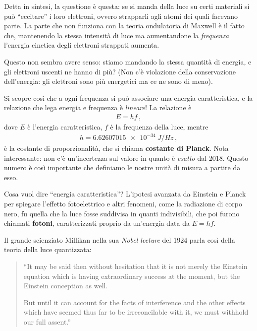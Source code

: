 \documentclass[a4paper,12pt]{article}
\begin{document}
Detta in sintesi, la questione è questa: se si manda della luce su certi materiali si può ``eccitare'' i loro elettroni, ovvero strapparli agli atomi dei quali facevano parte.
La parte che non funziona con la teoria ondulatoria di Maxwell è il fatto che, mantenendo la stessa intensità di luce ma aumentandone la \emph{frequenza} l'energia cinetica degli elettroni strappati aumenta. 

Questo non sembra avere senso: stiamo mandando la stessa quantità di energia, e gli elettroni uscenti ne hanno di più? 
(Non c'è violazione della conservazione dell'energia: gli elettroni sono più energetici ma ce ne sono di meno).

Si scopre così che a ogni frequenza si può associare una energia caratteristica, e la relazione che lega energia e frequenza è \emph{lineare}! La relazione è 
%
\begin{align}
E = h f
\,,
\end{align}
%
dove \(E\) è l'energia caratteristica, \(f\) è la frequenza della luce, mentre 
%
\begin{align}
h = \SI{6.62607015e-34}{J / Hz}
\,,
\end{align}
%
è la costante di proporzionalità, che si chiama \textbf{costante di Planck}. 
Nota interessante: non c'è un'incertezza sul valore in quanto è \emph{esatto} dal 2018. Questo numero è così importante che definiamo le nostre unità di misura a partire da esso.

Cosa vuol dire ``energia caratteristica''? 
L'ipotesi avanzata da Einstein e Planck per spiegare l'effetto fotoelettrico e altri fenomeni, come la radiazione di corpo nero, fu quella che la luce fosse suddivisa in quanti indivisibili, che poi furono chiamati \textbf{fotoni}, caratterizzati proprio da un'energia data da \(E = hf\). 

Il grande scienziato Millikan nella sua \emph{Nobel lecture} del 1924
\autocite[]{millikanRobertMillikanNobel1924} parla così della teoria della luce quantizzata: 

\begin{quotation}
``It may be said then without hesitation that it
is not merely the Einstein equation which is having extraordinary success at
the moment, but the Einstein conception as well.

But until it can account for the facts of interference and the other effects
which have seemed thus far to be irreconcilable with it, we must withhold
our full assent.''
\end{quotation}
\end{document}
